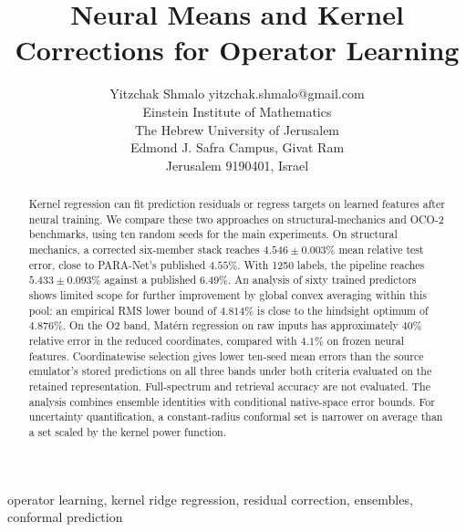 \documentclass[twoside,11pt]{article}
\newcommand{\errSix}{4.546}          %
\newcommand{\errSixSd}{0.003}
\newcommand{\saSixtyOracleRms}{4.876}
\newcommand{\saBound}{4.814}         %
\newcommand{\errBestLow}{5.433}      %
\newcommand{\errBestLowSd}{0.093}    %
\newcommand{\pubBestHi}{4.55}        %
\newcommand{\pubBestLo}{6.49}        %
\begin{document}
\raggedbottom

\title{Neural Means and Kernel Corrections for Operator Learning}

\author{\name Yitzchak Shmalo \email yitzchak.shmalo@gmail.com \\
       \addr Einstein Institute of Mathematics\\
       The Hebrew University of Jerusalem\\
       Edmond J. Safra Campus, Givat Ram\\
       Jerusalem 9190401, Israel}

\maketitle

\begin{abstract}%
Kernel regression can fit prediction residuals or regress targets on learned
features after neural training. We compare these two approaches on
structural-mechanics and OCO-2 benchmarks, using ten random seeds for the
main experiments. On structural mechanics, a corrected six-member stack reaches
$\errSix\pm\errSixSd\%$ mean relative test error, close to PARA-Net's published
$\pubBestHi\%$. With
1250 labels, the pipeline reaches $\errBestLow\pm\errBestLowSd\%$ against a
published $\pubBestLo\%$. An analysis of sixty trained predictors shows limited
scope for further improvement by global convex averaging within this pool:
an empirical RMS lower bound of
$\saBound\%$ is close to the hindsight optimum of $\saSixtyOracleRms\%$.
On the O2 band, Mat\'ern regression on raw inputs has approximately $40\%$
relative error in the reduced coordinates, compared with $4.1\%$ on frozen
neural features. Coordinatewise selection gives lower ten-seed mean errors than
the source emulator's stored predictions on all three bands under both
criteria evaluated on the retained representation. Full-spectrum and
retrieval accuracy are not evaluated. The analysis combines
ensemble identities with conditional native-space error bounds.
For uncertainty quantification, a constant-radius conformal set is narrower on
average than a set scaled by the kernel power function.
\end{abstract}

\begin{keywords}
operator learning, kernel ridge regression, residual correction, ensembles,
conformal prediction
\end{keywords}
\end{document}
